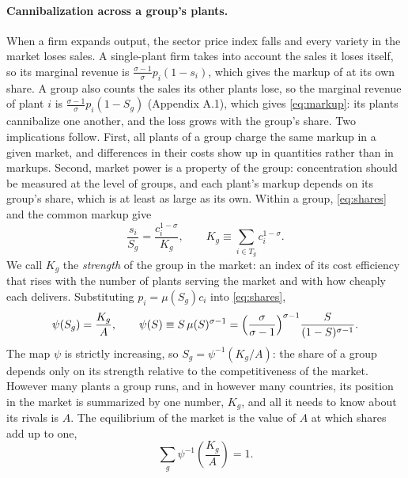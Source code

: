 \documentclass[11pt]{article}
\begin{document}
\paragraph{Cannibalization across a group's plants.} When a firm expands output, the sector price index falls
and every variety in the market loses sales. A single-plant firm takes into account
the sales it loses itself, so its marginal revenue is $\frac{\sigma-1}{\sigma}p_i(1-s_i)$,
which gives the markup of \citet{AtkesonBurstein2008} at its own share. A group also
counts the sales its other plants lose, so the marginal revenue of plant $i$ is
$\frac{\sigma-1}{\sigma}p_i(1-S_g)$ (Appendix A.1), which gives \eqref{eq:markup}: its
plants cannibalize one another,
and the loss grows with the group's share. Two implications follow. First, all plants
of a group charge the same markup in a given market, and differences in their costs
show up in quantities rather than in markups. Second, market power is a property of
the group: concentration should be measured at the level of groups, and each plant's
markup depends on its group's share, which is at least as large as its own. Within a group,
\eqref{eq:shares} and the common markup give
\begin{equation}
  \frac{s_i}{S_g}=\frac{c_i^{1-\sigma}}{K_g},
  \qquad
  K_g\equiv\sum_{i\in T_g}c_i^{1-\sigma}.
  \label{eq:strength}
\end{equation}
We call $K_g$ the \emph{strength} of the group in the market: an index of its cost
efficiency that rises with the number of plants serving the market and with how cheaply
each delivers. Substituting $p_i=\mu(S_g)c_i$ into \eqref{eq:shares},
\begin{equation}
  \psi(S_g)=\frac{K_g}{A},
  \qquad
  \psi(S)\equiv S\,\mu(S)^{\sigma-1}
  =\Bigl(\frac{\sigma}{\sigma-1}\Bigr)^{\sigma-1}\frac{S}{(1-S)^{\sigma-1}} .
  \label{eq:sharemap}
\end{equation}
The map $\psi$ is strictly increasing, so $S_g=\psi^{-1}(K_g/A)$: the share of a group
depends only on its strength relative to the competitiveness of the market. However
many plants a group runs, and in however many countries, its position in the market is
summarized by one number, $K_g$, and all it needs to know about its rivals is $A$. The
equilibrium of the market is the value of $A$ at which shares add up to one,
\begin{equation}
  \sum_{g}\psi^{-1}\!\left(\frac{K_g}{A}\right)=1 .
  \label{eq:clearing}
\end{equation}
\end{document}
